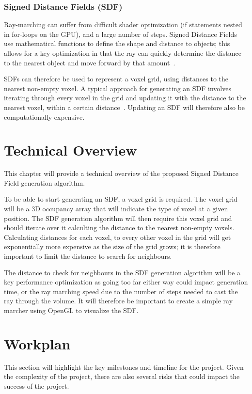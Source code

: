 \documentclass{article}
\begin{document}
\subsubsection{Signed Distance Fields (SDF)}
Ray-marching can suffer from difficult shader optimization (if statements nested in for-loops on the GPU), and a large number of steps. Signed Distance Fields use mathematical functions to define the shape and distance to objects; this allows for a key optimization in that the ray can quickly determine the distance to the nearest object and move forward by that amount~\cite{Benton}.

SDFs can therefore be used to represent a voxel grid, using distances to the nearest non-empty voxel. A typical approach for generating an SDF involves iterating through every voxel in the grid and updating it with the distance to the nearest voxel, within a certain distance~\cite{Cummings_2018}. Updating an SDF will therefore also be computationally expensive.

\section{Technical Overview}
This chapter will provide a technical overview of the proposed Signed Distance Field generation algorithm.

To be able to start generating an SDF, a voxel grid is required. The voxel grid will be a 3D occupancy array that will indicate the type of voxel at a given position. The SDF generation algorithm will then require this voxel grid and should iterate over it calculting the distance to the nearest non-empty voxels. Calculating distances for each voxel, to every other voxel in the grid will get exponentially more expensive as the size of the grid grows; it is therefore important to limit the distance to search for neighbours.

The distance to check for neighbours in the SDF generation algorithm will be a key performance optimization as going too far either way could impact generation time, or the ray marching speed due to the number of steps needed to cast the ray through the volume. It will therefore be important to create a simple ray marcher using OpenGL to visualize the SDF.

\section{Workplan}
This section will highlight the key milestones and timeline for the project. Given the complexity of the project, there are also several risks that could impact the success of the project.
\end{document}
